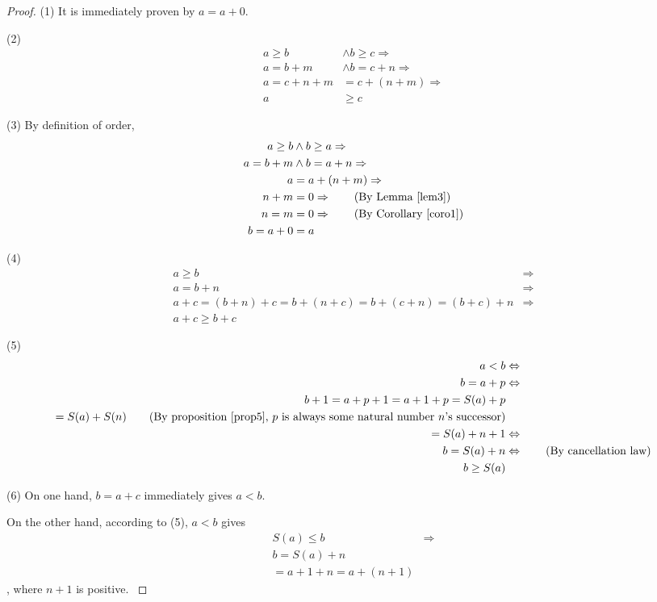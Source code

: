 \begin{proof}
(1) It is immediately proven by $a=a+0$.

(2) 
\begin{align*}
a \geq b &\wedge b \geq c \Rightarrow \\
a = b+m &\wedge b = c+n \Rightarrow \\
a = c+n+m &= c+(n+m) \Rightarrow \\
a &\geq c 
\end{align*}

(3)
By definition of order, 
\begin{align*}
a \geq b &\wedge b \geq a \Rightarrow \\
a = b+m &\wedge b = a+n \Rightarrow \\
a &= a+(n+m) \Rightarrow \\
n+m&=0 \Rightarrow \tag{By Lemma \ref{lem3}}\\
n=m&=0 \Rightarrow \tag{By Corollary \ref{coro1}} \\
b=a+0&=a
\end{align*}

(4)
\begin{align*}
a \geq b &\Rightarrow \\
a = b+n &\Rightarrow \\
a+c=(b+n)+c=b+(n+c)=b+(c+n)=(b+c)+n &\Rightarrow \\
a+c \geq b+c
\end{align*}

(5)
\begin{align*}
a<b &\Leftrightarrow \\
b=a+p &\Leftrightarrow \\
b+1=a+p+1=a+1+p=S(a)+p \\
=S(a)+S(n) \tag{By proposition \ref{prop5}, $p$ is always some natural number $n$'s successor}\\
=S(a)+n+1 &\Leftrightarrow \\
b=S(a)+n &\Leftrightarrow \tag{By cancellation law} \\
b \geq S(a)
\end{align*} \label{prop.5}

(6)
On one hand, $b=a+c$ immediately gives $a<b$.

On the other hand, according to (5), $a<b$ gives 
\begin{align*}
S(a) \leq b  &\Rightarrow\\
b = S(a) + n& \\
= a+1+n = a+(n+1)&
\end{align*}, where $n+1$ is positive. \label{prop.6}
\end{proof}

